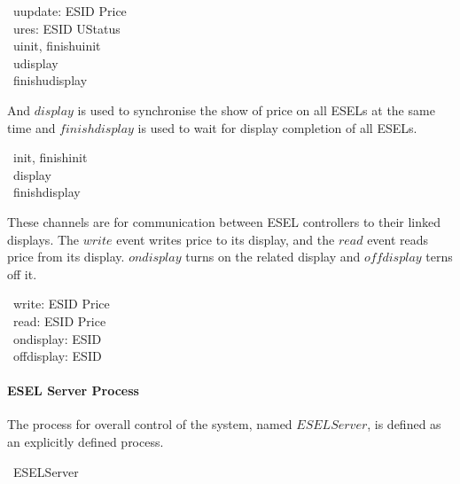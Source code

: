\begin{circus}
	\circchannel\ uupdate: ESID \cross Price \\
	\circchannel\ ures: ESID \cross UStatus \\
	\circchannel\ uinit, finishuinit\\
	\circchannel\ udisplay \\
	\circchannel\ finishudisplay
\end{circus}

And $display$ is used to synchronise the show of price on all ESELs at the same time and $finishdisplay$ is used to wait for display completion of all ESELs.
\begin{circus}
	\circchannel\ init, finishinit \\
	\circchannel\ display \\
	\circchannel\ finishdisplay
\end{circus}

These channels are for communication between ESEL controllers to their linked displays. The $write$ event writes price to its display, and the $read$ event reads price from its display. $ondisplay$ turns on the related display and $offdisplay$ terns off it.
\begin{circus}
	\circchannel\ write: ESID \cross Price \\
	\circchannel\ read: ESID \cross Price \\
	\circchannel\ ondisplay: ESID \\
	\circchannel\ offdisplay: ESID 
\end{circus}

\paragraph{ESEL Server Process}
The process for overall control of the system, named $ESELServer$, is defined as an explicitly defined process.

\begin{circus}
	\circprocess\ ESELServer \circdef \circbegin \\
\end{circus}

